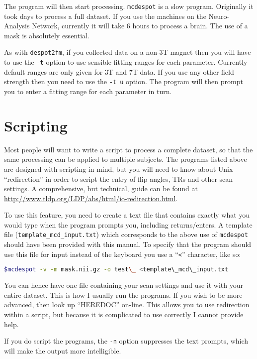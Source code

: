 \documentclass{report}
\begin{document}
The program will then start processing. \texttt{mcdespot} is a slow program. Originally it took days to process a full dataset. If you use the machines on the Neuro-Analysis Network, currently it will take 6 hours to process a brain. The use of a mask is absolutely essential.

As with \texttt{despot2fm}, if you collected data on a non-3T magnet then you will have to use the \texttt{-t} option to use sensible fitting ranges for each parameter. Currently default ranges are only given for 3T and 7T data. If you use any other field strength then you need to use the \texttt{-t u} option. The program will then prompt you to enter a fitting range for each parameter in turn.

\section{Scripting}\label{scripting}

Most people will want to write a script to process a complete dataset, so that the same processing can be applied to multiple subjects. The programs listed above are designed with scripting in mind, but you will need to know about Unix ``redirection'' in order to script the entry of flip angles, TRs and other scan settings. A comprehensive, but technical, guide can be found at \url{http://www.tldp.org/LDP/abs/html/io-redirection.html}.

To use this feature, you need to create a text file that contains exactly what you would type when the program prompts you, including returns/enters. A template file (\texttt{template\_mcd\_input.txt}) which corresponds to the above use of \texttt{mcdespot} should have been provided with this manual. To specify that the program should use this file for input instead of the keyboard you use a ``\texttt{<}'' character, like so:

\begin{lstlisting}[language=sh]
$mcdespot -v -m mask.nii.gz -o test\_ <template\_mcd\_input.txt
\end{lstlisting}

You can hence have one file containing your scan settings and use it with your entire dataset. This is how I usually run the programs. If you wish to be more advanced, then look up ``HEREDOC'' on-line. This allows you to use redirection within a script, but because it is complicated to use correctly I cannot provide help.

If you do script the programs, the \texttt{-n} option suppresses the text prompts, which will make the output more intelligible.
\end{document}
